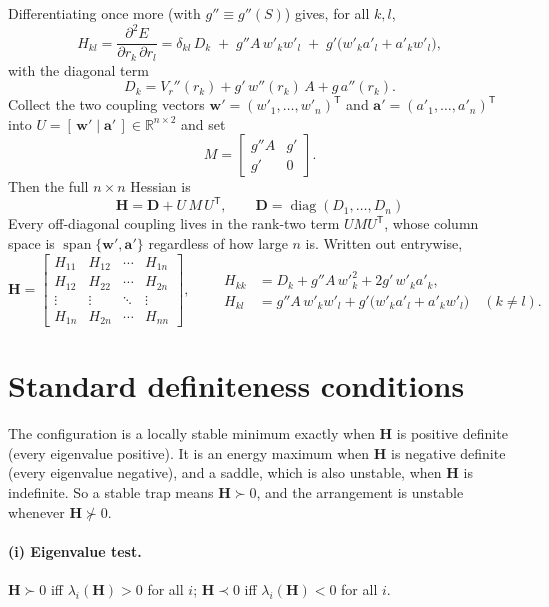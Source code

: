 \documentclass[11pt]{article}
\newcommand{\wv}{\mathbf{w}'}
\newcommand{\av}{\mathbf{a}'}
\newcommand{\tp}{^{\mathsf T}}
\DeclareMathOperator{\diag}{diag}
\begin{document}
Differentiating once more (with $g''\equiv g''(S)$) gives, for all $k,l$,
\[
H_{kl}=\frac{\partial^2 E}{\partial r_k\,\partial r_l}
=\delta_{kl}\,D_k
\;+\;g''A\,w'_k w'_l
\;+\;g'\bigl(w'_k a'_l+a'_k w'_l\bigr),
\]
with the diagonal term
\[
D_k=V_r''(r_k)+g'\,w''(r_k)\,A+g\,a''(r_k).
\]
Collect the two coupling vectors $\wv=(w'_1,\dots,w'_n)\tp$ and
$\av=(a'_1,\dots,a'_n)\tp$ into $U=[\,\wv\mid\av\,]\in\mathbb{R}^{n\times2}$ and set
\[
M=\begin{bmatrix} g''A & g' \\[2pt] g' & 0 \end{bmatrix}.
\]
Then the full $n\times n$ Hessian is
\[
\boxed{\;\mathbf{H}=\mathbf{D}+U\,M\,U\tp,\qquad \mathbf{D}=\diag(D_1,\dots,D_n)\;}
\]
Every off-diagonal coupling lives in the rank-two term $U M U\tp$, whose column space is
$\operatorname{span}\{\wv,\av\}$ regardless of how large $n$ is. Written out entrywise,
\[
\mathbf{H}=
\begin{bmatrix}
H_{11} & H_{12} & \cdots & H_{1n}\\
H_{12} & H_{22} & \cdots & H_{2n}\\
\vdots & \vdots & \ddots & \vdots\\
H_{1n} & H_{2n} & \cdots & H_{nn}
\end{bmatrix},
\qquad
\begin{aligned}
H_{kk}&=D_k+g''A\,w'^2_k+2g'\,w'_k a'_k,\\
H_{kl}&=g''A\,w'_k w'_l+g'\bigl(w'_k a'_l+a'_k w'_l\bigr)\quad(k\ne l).
\end{aligned}
\]

\section{Standard definiteness conditions}

The configuration is a locally stable minimum exactly when $\mathbf{H}$ is positive
definite (every eigenvalue positive). It is an energy maximum when $\mathbf{H}$ is negative
definite (every eigenvalue negative), and a saddle, which is also unstable, when
$\mathbf{H}$ is indefinite. So a stable trap means $\mathbf{H}\succ0$, and the arrangement
is unstable whenever $\mathbf{H}\not\succ0$.

\paragraph{(i) Eigenvalue test.}
$\mathbf{H}\succ0$ iff $\lambda_i(\mathbf{H})>0$ for all $i$; $\mathbf{H}\prec0$ iff
$\lambda_i(\mathbf{H})<0$ for all $i$.
\end{document}

